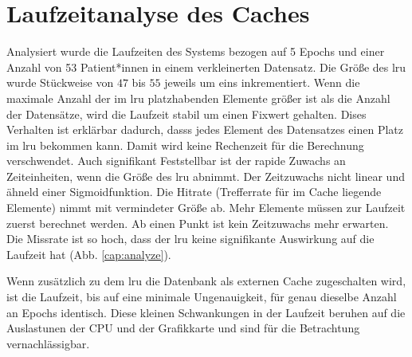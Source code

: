 \clearpage
\section{Laufzeitanalyse des Caches}\label{analyze}
Analysiert wurde die Laufzeiten des Systems bezogen auf 5 Epochs und einer Anzahl von 53 Patient*innen in einem verkleinerten Datensatz. Die Größe des \ac{lru} wurde Stückweise von $47$ bis $55$ jeweils um eins inkrementiert. Wenn die maximale Anzahl der im \ac{lru} platzhabenden Elemente größer ist als die Anzahl der Datensätze, wird die Laufzeit stabil um einen Fixwert gehalten. Dises Verhalten ist erklärbar dadurch, dasss jedes Element des Datensatzes einen Platz im \ac{lru} bekommen kann. Damit wird keine Rechenzeit für die Berechnung verschwendet. Auch signifikant Feststellbar ist der rapide Zuwachs an Zeiteinheiten, wenn die Größe des \ac{lru} abnimmt. Der Zeitzuwachs nicht linear und ähneld einer Sigmoidfunktion. Die Hitrate (Trefferrate für im Cache liegende Elemente) nimmt mit vermindeter Größe ab. Mehr Elemente müssen zur Laufzeit zuerst berechnet werden. Ab einen Punkt ist kein Zeitzuwachs mehr erwarten. Die Missrate ist so hoch, dass der \ac{lru} keine signifikante Auswirkung auf die Laufzeit hat (Abb. \ref{cap:analyze}).

Wenn zusätzlich zu dem \ac{lru} die Datenbank als externen Cache zugeschalten wird, ist die Laufzeit, bis auf eine minimale Ungenauigkeit, für genau dieselbe Anzahl an Epochs identisch. Diese kleinen Schwankungen in der Laufzeit beruhen auf die Auslastunen der CPU und der Grafikkarte und sind für die Betrachtung vernachlässigbar.

